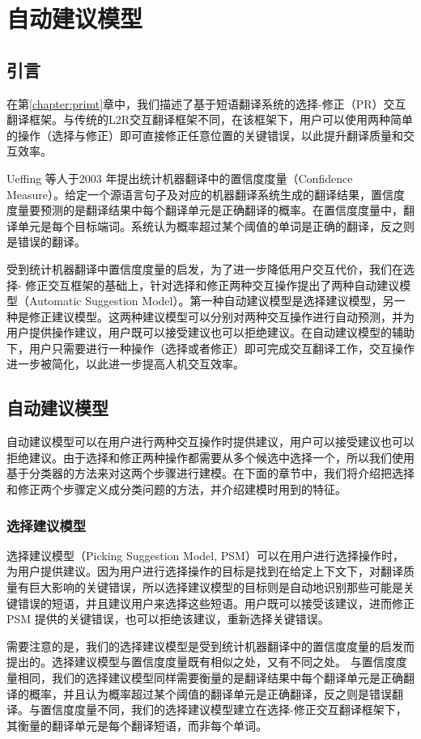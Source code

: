 \documentclass[master, winfont]{njuthesis}
\begin{document}
\chapter{自动建议模型}
\label{chapter:asm}
\section{引言}
在第\ref{chapter:primt}章中，我们描述了基于短语翻译系统的选择-修正（PR）交互翻译框架。与传统的L2R交互翻译框架不同，在该框架下，用户可以使用两种简单的操作（选择与修正）即可直接修正任意位置的关键错误，以此提升翻译质量和交互效率。

Ueffing 等人于2003 年提出统计机器翻译中的置信度度量（Confidence Measure）\cite{ueffing2003confidence}。给定一个源语言句子及对应的机器翻译系统生成的翻译结果，置信度度量要预测的是翻译结果中每个翻译单元是正确翻译的概率。在置信度度量中，翻译单元是每个目标端词。系统认为概率超过某个阈值的单词是正确的翻译，反之则是错误的翻译。

受到统计机器翻译中置信度度量的启发，为了进一步降低用户交互代价，我们在选择- 修正交互框架的基础上，针对选择和修正两种交互操作提出了两种自动建议模型（Automatic Suggestion Model）。第一种自动建议模型是选择建议模型，另一种是修正建议模型。这两种建议模型可以分别对两种交互操作进行自动预测，并为用户提供操作建议，用户既可以接受建议也可以拒绝建议。在自动建议模型的辅助下，用户只需要进行一种操作（选择或者修正）即可完成交互翻译工作，交互操作进一步被简化，以此进一步提高人机交互效率。
\section{自动建议模型} \label{sec:asm}
自动建议模型可以在用户进行两种交互操作时提供建议，用户可以接受建议也可以拒绝建议。由于选择和修正两种操作都需要从多个候选中选择一个，所以我们使用基于分类器的方法来对这两个步骤进行建模。在下面的章节中，我们将介绍把选择和修正两个步骤定义成分类问题的方法，并介绍建模时用到的特征。
\subsection {选择建议模型}
\label{sec:psm}
选择建议模型（Picking Suggestion Model, PSM）可以在用户进行选择操作时，为用户提供建议。因为用户进行选择操作的目标是找到在给定上下文下，对翻译质量有巨大影响的关键错误，所以选择建议模型的目标则是自动地识别那些可能是关键错误的短语，并且建议用户来选择这些短语。用户既可以接受该建议，进而修正PSM 提供的关键错误，也可以拒绝该建议，重新选择关键错误。

需要注意的是，我们的选择建议模型是受到统计机器翻译中的置信度度量的启发而提出的。选择建议模型与置信度度量既有相似之处，又有不同之处。
与置信度度量相同，我们的选择建议模型同样需要衡量的是翻译结果中每个翻译单元是正确翻译的概率，并且认为概率超过某个阈值的翻译单元是正确翻译，反之则是错误翻译。与置信度度量不同，我们的选择建议模型建立在选择-修正交互翻译框架下，其衡量的翻译单元是每个翻译短语，而非每个单词。
\end{document}
